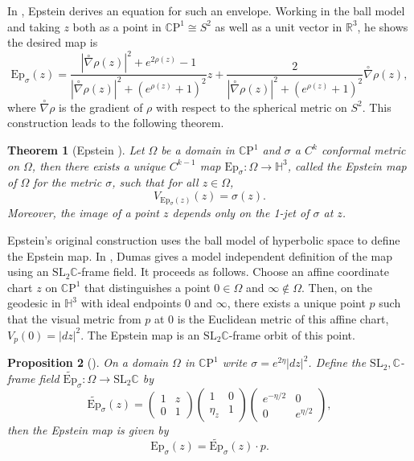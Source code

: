 \documentclass{amsart}
\newcommand{\R}{\mathbb{R}}
\newcommand{\C}{\mathbb{C}}
\newcommand{\CP}{\mathbb{C}\mathrm{P}}
\renewcommand{\H}{\mathbb{H}}
\newtheorem{thm}{Theorem}[section]
\newtheorem{prop}[thm]{Proposition}
\begin{document}
In \cite{epstein1984}, Epstein derives an equation for such an envelope. 
Working in the ball model and taking $z$ both as a point in $\CP^1 \cong S^2$ as well as a unit vector in $\R^3$, he shows the desired map is 
\[
\mathrm{Ep}_\sigma(z) = \frac{|\overset{\circ}{\nabla}\rho(z)|^2 + e^{2\rho(z)} - 1}{|\overset{\circ}{\nabla}\rho(z)|^2 + (e^{\rho(z)}+1)^2} z + \frac{2}{|\overset{\circ}{\nabla}\rho(z)|^2 + (e^{\rho(z)}+1)^2} \overset{\circ}{\nabla}\rho(z),
\]
where $\overset{\circ}{\nabla}\rho$ is the gradient of $\rho$ with respect to the spherical metric on $S^2$. 
This construction leads to the following theorem. 


\begin{thm}[Epstein \cite{epstein1984}]
Let $\Omega$ be a domain in $\CP^1$  and $\sigma$ a $C^k$ conformal metric on $\Omega$, then there exists a unique $C^{k-1}$ map $\mathrm{Ep}_\sigma : \Omega \to \H^3$, called the Epstein map of $\Omega$ for the metric $\sigma$, such that for all $z \in \Omega$,
\[
V_{\mathrm{Ep}_\sigma(z)}(z) = \sigma(z).
\]
Moreover, the image of a point $z$ depends only on the 1-jet of $\sigma$ at $z$.
\label{epstein-map-def}
\end{thm}

Epstein's original construction uses the ball model of hyperbolic space to define the Epstein map. 
In \cite{dumas2017}, Dumas gives a model independent definition of the map using an $\text{SL}_2\C$-frame field. 
It proceeds as follows. 
Choose an affine coordinate chart $z$ on $\CP^1$ that distinguishes a point $0 \in \Omega$ and $\infty \notin \Omega$. 
Then, on the geodesic in $\H^3$ with ideal endpoints $0$ and $\infty$, there exists a unique point $p$ such that the visual metric from $p$ at $0$ is the Euclidean metric of this affine chart, $V_p(0) = |dz|^2$. 
The Epstein map is an $\mathrm{SL}_2\C$-frame orbit of this point.     


\begin{prop}[\cite{dumas2017}]
On a domain $\Omega$ in $\CP^1$ write $\sigma = e^{2\eta}|dz|^2$. Define the $\mathrm{SL}_2,\C$-frame field $\widetilde{\mathrm{Ep}}_\sigma: \Omega \to \mathrm{SL}_2\C$ by 
\[
\widetilde{\mathrm{Ep}}_\sigma(z) =
\begin{pmatrix}
1 & z \\
0 & 1
\end{pmatrix}
\begin{pmatrix}
1 & 0 \\
\eta_z & 1
\end{pmatrix}
\begin{pmatrix}
e^{-\eta/2} & 0 \\
0 & e^{\eta/2}
\end{pmatrix},
\]
then the Epstein map is given by 
\[
\mathrm{Ep}_\sigma(z) = \widetilde{\mathrm{Ep}}_\sigma(z) \cdot p.
\]
\end{prop}
\end{document}
